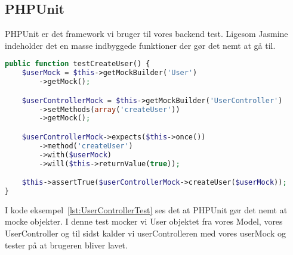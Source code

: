 \subsection{PHPUnit}
PHPUnit er det framework vi bruger til vores backend test. Ligesom Jasmine indeholder det
en masse indbyggede funktioner der gør det nemt at gå til.
\begin{lstlisting}[caption={UserControllerTest.php}, language={PHP}, label={lst:UserControllerTest}]
public function testCreateUser() {
    $userMock = $this->getMockBuilder('User')
        ->getMock();

    $userControllerMock = $this->getMockBuilder('UserController')
        ->setMethods(array('createUser'))
        ->getMock();

    $userControllerMock->expects($this->once())
        ->method('createUser')
        ->with($userMock)
        ->will($this->returnValue(true));

    $this->assertTrue($userControllerMock->createUser($userMock));
}
\end{lstlisting}
I kode eksempel~\ref{lst:UserControllerTest} ses det at PHPUnit gør det nemt at mocke objekter.
I denne test mocker vi User objektet fra vores Model, vores UserController og til sidst kalder vi userControlleren 
med vores userMock og tester på at brugeren bliver lavet.

